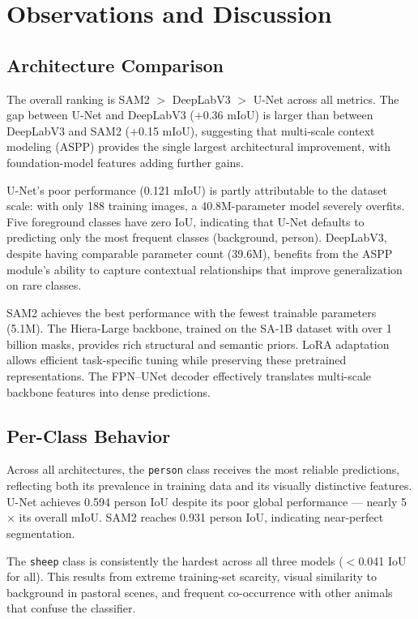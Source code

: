 \documentclass[11pt]{article}
\begin{document}
\section{Observations and Discussion}

\subsection{Architecture Comparison}

The overall ranking is SAM2 $>$ DeepLabV3 $>$ U-Net across all metrics. The gap between U-Net and DeepLabV3 ($+$0.36 mIoU) is larger than between DeepLabV3 and SAM2 ($+$0.15 mIoU), suggesting that multi-scale context modeling (ASPP) provides the single largest architectural improvement, with foundation-model features adding further gains.

U-Net's poor performance (0.121 mIoU) is partly attributable to the dataset scale: with only 188 training images, a 40.8M-parameter model severely overfits. Five foreground classes have zero IoU, indicating that U-Net defaults to predicting only the most frequent classes (background, person). DeepLabV3, despite having comparable parameter count (39.6M), benefits from the ASPP module's ability to capture contextual relationships that improve generalization on rare classes.

SAM2 achieves the best performance with the fewest trainable parameters (5.1M). The Hiera-Large backbone, trained on the SA-1B dataset with over 1 billion masks, provides rich structural and semantic priors. LoRA adaptation allows efficient task-specific tuning while preserving these pretrained representations. The FPN--UNet decoder effectively translates multi-scale backbone features into dense predictions.

\subsection{Per-Class Behavior}

Across all architectures, the \texttt{person} class receives the most reliable predictions, reflecting both its prevalence in training data and its visually distinctive features. U-Net achieves 0.594 person IoU despite its poor global performance --- nearly 5$\times$ its overall mIoU. SAM2 reaches 0.931 person IoU, indicating near-perfect segmentation.

The \texttt{sheep} class is consistently the hardest across all three models ($<$0.041 IoU for all). This results from extreme training-set scarcity, visual similarity to background in pastoral scenes, and frequent co-occurrence with other animals that confuse the classifier.
\end{document}
